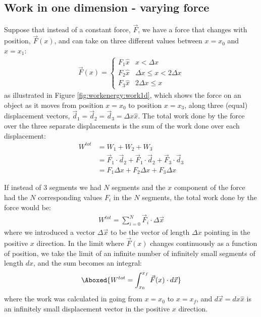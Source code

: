 \subsection{Work in one dimension - varying force}
Suppose that instead of a constant force, $\vec F$, we have a force that changes with position, $\vec F(x)$, and can take on three different values between $x=x_0$ and $x=x_1$:
\begin{align*}
  \vec F (x)=
  \begin{cases}
    F_1\hat x & x<\Delta x \\
    F_2\hat x & \Delta x \leq x< 2\Delta x \\
    F_3\hat x & 2\Delta x \leq x
  \end{cases}
\end{align*}
as illustrated in Figure \ref{fig:workenergy:work1d}, which shows the force on an object as it moves from position $x=x_0$ to position $x=x_3$, along three (equal) displacement vectors, $\vec d_1=\vec d_2=\vec d_3=\Delta x \hat x$. 
The total work done by the force over the three separate displacements is the sum of the work done over each displacement:
\begin{align*}
W^{tot}&=W_1+W_2+W_3\\
&=\vec F_1\cdot \vec d_2+\vec F_1\cdot \vec d_2+\vec F_3\cdot \vec d_3\\
&= F_1\Delta x +F_2\Delta x + F_3\Delta x
\end{align*} 

If instead of 3 segments we had $N$ segments and the $x$ component of the force had the $N$ corresponding values $F_i$ in the $N$ segments, the total work done by the force would be:
\begin{align*}
W^{tot} = \sum_{i=0}^N\vec F_i \cdot \Delta \vec x
\end{align*}
where we introduced a vector $\Delta \vec x$ to be the vector of length $\Delta x$ pointing in the positive $x$ direction. In the limit where $\vec F(x)$ changes continuously as a function of position, we take the limit of an infinite number of infinitely small segments of length $dx$, and the sum becomes an integral:
\begin{align}
\Aboxed{W^{tot} = \int_{x_0}^{x_f}\vec F(x) \cdot d\vec x}
\end{align}
where the work was calculated in going from $x=x_0$ to $x=x_f$, and $d\vec x=dx\hat x$ is an infinitely small displacement vector in the positive $x$ direction.

